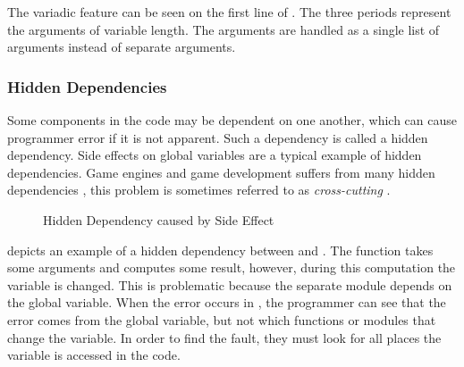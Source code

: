 The variadic feature can be seen on the first line of . The three periods represent the arguments of variable length. The arguments are handled as a single list of arguments instead of separate arguments.

\subsubsection{Hidden Dependencies}
Some components in the code may be dependent on one another, which can cause programmer error if it is not apparent. Such a dependency is called a hidden dependency. Side effects on global variables are a typical example of hidden dependencies. Game engines and game development suffers from many hidden dependencies \cite{blow2004game, guana2015building, nystrom2014game}, this problem is sometimes referred to as \textit{cross-cutting} \cite{kiczales1997aspect}.

\begin{figure}[H]
    \centering
    \caption{Hidden Dependency caused by Side Effect}
    \label{fig:hid-dep-exmpl}
\end{figure}

 depicts an example of a hidden dependency between  and . The function takes some arguments and computes some result, however, during this computation the variable  is changed. This is problematic because the separate module  depends on the global variable. When the error occurs in , the programmer can see that the error comes from the global variable, but not which functions or modules that change the variable. In order to find the fault, they must look for all places the variable is accessed in the code.

